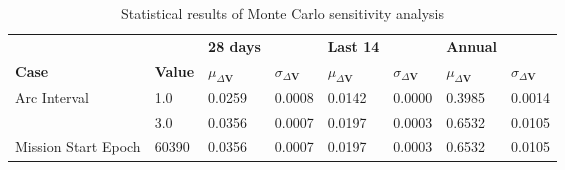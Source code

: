 \begin{table}[h!]
\centering
\begin{tabular}{llllllll}
 &  & \cellcolor[HTML]{EFEFEF}\textbf{28 days} &  & \cellcolor[HTML]{EFEFEF}\textbf{Last 14} & & \cellcolor[HTML]{EFEFEF}\textbf{Annual} \\
\rowcolor[HTML]{EFEFEF} 
\textbf{Case} & \textbf{Value} & \textbf{$\mu_{\Delta \boldsymbol{V}}$} & \textbf{$\sigma_{\Delta \boldsymbol{V}}$} & \textbf{$\mu_{\Delta \boldsymbol{V}}$} & \textbf{$\sigma_{\Delta \boldsymbol{V}}$} & \textbf{$\mu_{\Delta \boldsymbol{V}}$} & \textbf{$\sigma_{\Delta \boldsymbol{V}}$} \\ 
Arc Interval & 1.0 & 0.0259 & 0.0008 & 0.0142 & 0.0000 & 0.3985 & 0.0014 \\ 
 & 3.0 & 0.0356 & 0.0007 & 0.0197 & 0.0003 & 0.6532 & 0.0105 \\ 
Mission Start Epoch & 60390 & 0.0356 & 0.0007 & 0.0197 & 0.0003 & 0.6532 & 0.0105 \\ 
\end{tabular}
\caption{Statistical results of Monte Carlo sensitivity analysis}
\label{tab:SensitivityAnalysis}
\end{table}
